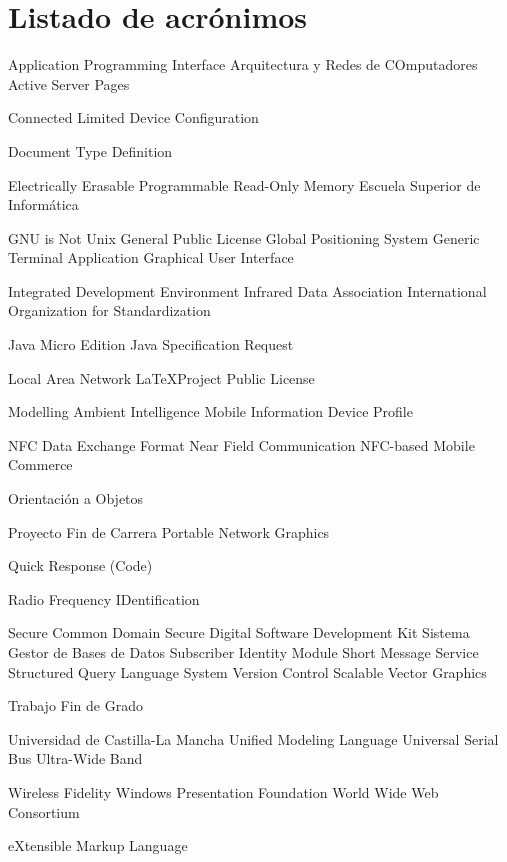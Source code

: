 
\chapter{Listado de acrónimos}

{\small
\begin{acronym}[XXXXXXXX]
       {Application Programming Interface}
      {Arquitectura y Redes de COmputadores}
       {Active Server Pages}

      {Connected Limited Device Configuration}

       {Document Type Definition}

    {Electrically Erasable Programmable Read-Only Memory}
       {Escuela Superior de Informática}

       {GNU is Not Unix}
       {General Public License}
       {Global Positioning System}
       {Generic Terminal Application}
       {Graphical User Interface}

       {Integrated Development Environment}
      {Infrared Data Association}
       {International Organization for Standardization}

    {Java Micro Edition}
       {Java Specification Request}

       {Local Area Network}
      {\LaTeX Project Public License}

      {Modelling Ambient Intelligence}
      {Mobile Information Device Profile}

      {NFC Data Exchange Format}
       {Near Field Communication}
       {NFC-based Mobile Commerce}

        {Orientación a Objetos}

       {Proyecto Fin de Carrera}
       {Portable Network Graphics}
  
        {Quick Response (Code)}

      {Radio Frequency IDentification}

       {Secure Common Domain}
        {Secure Digital}
       {Software Development Kit}
      {Sistema Gestor de Bases de Datos}
       {Subscriber Identity Module}
       {Short Message Service}
       {Structured Query Language}
       {System Version Control}
       {Scalable Vector Graphics}

       {Trabajo Fin de Grado}

      {Universidad de Castilla-La Mancha}
       {Unified Modeling Language}
       {Universal Serial Bus}
       {Ultra-Wide Band}

      {Wireless Fidelity}
       {Windows Presentation Foundation}
       {World Wide Web Consortium}

       {eXtensible Markup Language}
\end{acronym}
}


